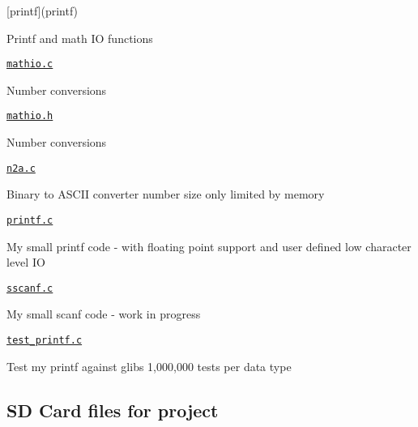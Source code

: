 \begin{DoxyItemize}
\item \mbox{[}printf\mbox{]}(printf)
\begin{DoxyItemize}
\item Printf and math IO functions
\item \href{printf/mathio.c}{\tt mathio.\+c}
\begin{DoxyItemize}
\item Number conversions
\end{DoxyItemize}
\item \href{printf/mathio.h}{\tt mathio.\+h}
\begin{DoxyItemize}
\item Number conversions
\end{DoxyItemize}
\item \href{printf/n2a.c}{\tt n2a.\+c}
\begin{DoxyItemize}
\item Binary to A\+S\+C\+II converter number size only limited by memory
\end{DoxyItemize}
\item \href{printf/printf.c}{\tt printf.\+c}
\begin{DoxyItemize}
\item My small printf code -\/ with floating point support and user defined low character level IO
\end{DoxyItemize}
\item \href{printf/sscanf.c}{\tt sscanf.\+c}
\begin{DoxyItemize}
\item My small scanf code -\/ work in progress
\end{DoxyItemize}
\item \href{printf/test_printf.c}{\tt test\+\_\+printf.\+c}
\begin{DoxyItemize}
\item Test my printf against glibs 1,000,000 tests per data type
\end{DoxyItemize}
\end{DoxyItemize}
\end{DoxyItemize}

\subsection*{SD Card files for project}


